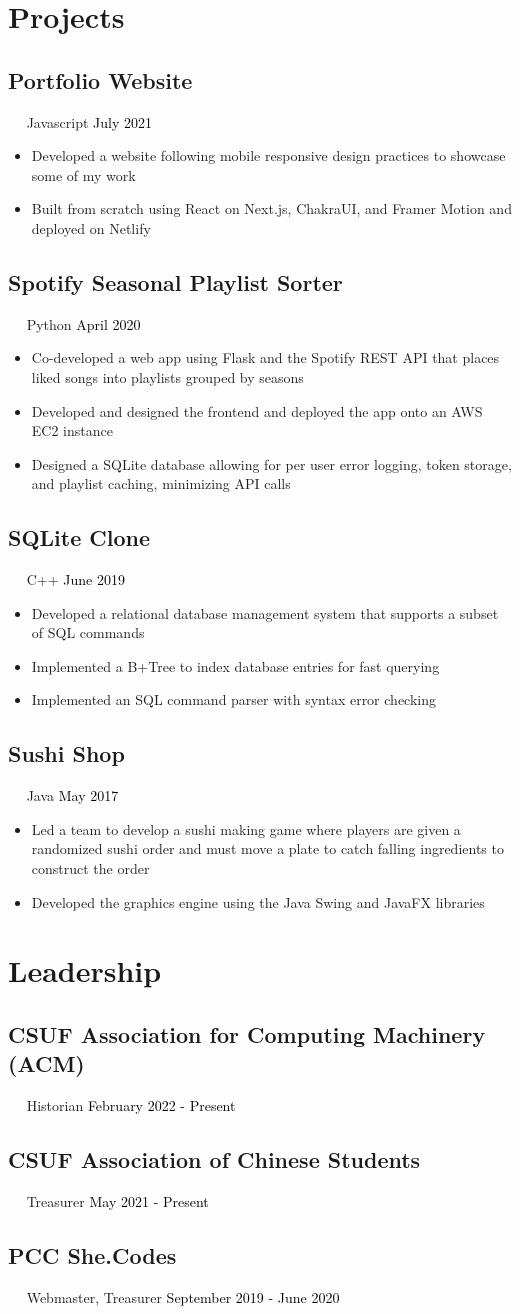 \documentclass{article}
\newcommand{\resumesection}[3]{
    \subsection*{#1}
    \ 
    \ 
    \small
    \textcolor{csufgrey}{#2}
    \normalsize
    \hfill
    \textcolor{black}{#3}
    \normalsize
}
\begin{document}
\section*{Projects}
\resumesection{Portfolio Website}{Javascript}{July 2021}
\begin{itemize}
    \item Developed a website following mobile responsive design practices to showcase some of my work
    \item Built from scratch using React on Next.js, ChakraUI, and Framer Motion and deployed on Netlify
\end{itemize}
\resumesection{Spotify Seasonal Playlist Sorter}{Python}{April 2020}
\begin{itemize}
    \item Co-developed a web app using Flask and the Spotify REST API that places liked songs into playlists grouped by seasons
    \item Developed and designed the frontend and deployed the app onto an AWS EC2 instance
    \item Designed a SQLite database allowing for per user error logging, token storage, and playlist caching, minimizing API calls
\end{itemize}

\resumesection{SQLite Clone}{C++}{June 2019}
\begin{itemize}
    \item Developed a relational database management system that supports a subset of SQL commands
    \item Implemented a B+Tree to index database entries for fast querying
    \item Implemented an SQL command parser with syntax error checking
\end{itemize}

\resumesection{Sushi Shop}{Java}{May 2017}
\begin{itemize}
    \item Led a team to develop a sushi making game where players are given a randomized sushi order and must move a plate to catch falling ingredients to construct the order
    \item Developed the graphics engine using the Java Swing and JavaFX libraries
\end{itemize}
\section*{Leadership}
\resumesection{CSUF Association for Computing Machinery (ACM)}{Historian}{February 2022 - Present}
\resumesection{CSUF Association of Chinese Students}{Treasurer}{May 2021 - Present}
\resumesection{PCC She.Codes}{Webmaster, Treasurer}{September 2019 - June 2020}
\end{document}

